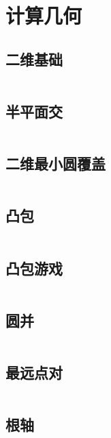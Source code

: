 \chapter{计算几何}
\section{二维基础}
\inputminted{cpp}{./computational_geometry/two_dimensions_basic.cpp}
\section{半平面交}
\inputminted{cpp}{./computational_geometry/half_plane_intersection.cpp}
\section{二维最小圆覆盖}
\inputminted{cpp}{./computational_geometry/2D-minimum-circle-coverage.cpp}
\section{凸包}
\inputminted{cpp}{./computational_geometry/convex_hull.cpp}
\section{凸包游戏}
\inputminted{cpp}{./computational_geometry/convex_hull_game.cpp}
\section{圆并}
\inputminted{cpp}{./computational_geometry/circle_union.cpp}
\section{最远点对}
\inputminted{cpp}{./computational_geometry/farthest_point_pair.cpp}
\section{根轴}
